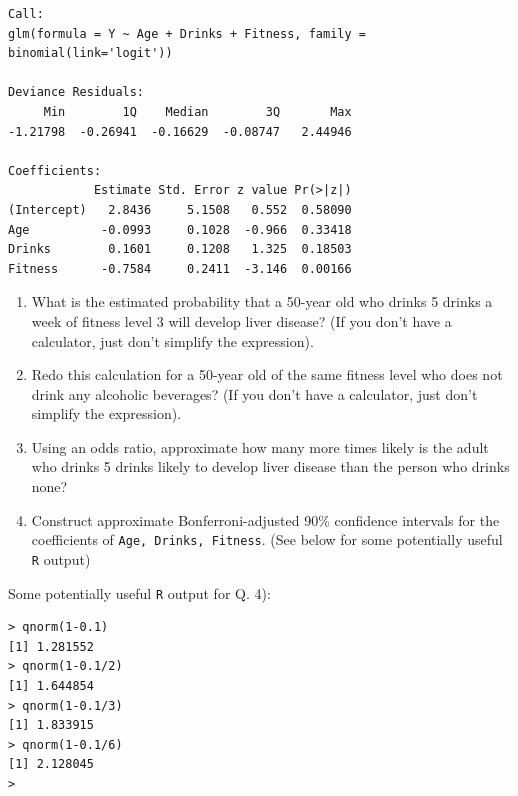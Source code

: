 \documentclass{article}
\begin{document}
\begin{enumerate}
\begin{verbatim}
Call:
glm(formula = Y ~ Age + Drinks + Fitness, family = binomial(link='logit'))

Deviance Residuals:
     Min        1Q    Median        3Q       Max
-1.21798  -0.26941  -0.16629  -0.08747   2.44946

Coefficients:
            Estimate Std. Error z value Pr(>|z|)
(Intercept)   2.8436     5.1508   0.552  0.58090
Age          -0.0993     0.1028  -0.966  0.33418
Drinks        0.1601     0.1208   1.325  0.18503
Fitness      -0.7584     0.2411  -3.146  0.00166 

\end{verbatim}

\begin{enumerate}

\item What is the estimated probability that a 50-year old who drinks
5 drinks a week of fitness level 3 will develop
liver disease? ({\sc If you don't have a calculator, just don't simplify the expression}).

\item Redo this calculation for a 50-year old of the same fitness level who does not drink any alcoholic beverages? ({\sc If you don't have a calculator, just don't simplify the expression}).


\item Using an odds ratio, approximate how many more times likely is the
adult who drinks 5 drinks likely to develop liver disease than the person who drinks none? 


\item Construct approximate Bonferroni-adjusted 90\% confidence intervals
for the coefficients of {\tt Age, Drinks, Fitness}. ({\sc See below for some potentially
useful {\tt R} output})

\end{enumerate}

\newpage

Some potentially useful {\tt R} output for Q. 4):

\begin{verbatim}
> qnorm(1-0.1)
[1] 1.281552
> qnorm(1-0.1/2)
[1] 1.644854
> qnorm(1-0.1/3)
[1] 1.833915
> qnorm(1-0.1/6)
[1] 2.128045
>                  
\end{verbatim}

\end{enumerate}
\end{document}
